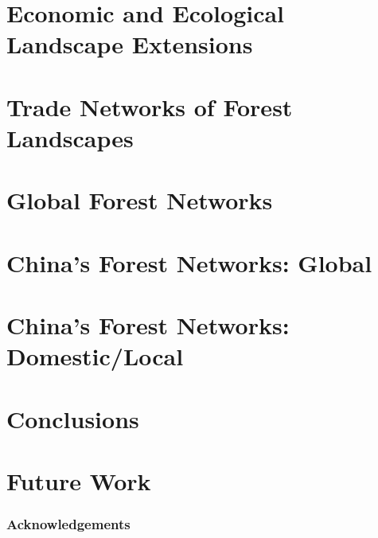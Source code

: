 \documentclass[aspectratio=169]{beamer}
\begin{document}
\section{Economic and Ecological Landscape Extensions}



\section{Trade Networks of Forest Landscapes}

\section{Global Forest Networks}


\section{China's Forest Networks: Global}


\section{China's Forest Networks: Domestic/Local}


\section{Conclusions}

\section{Future Work}

\begin{frame}
  \frametitle{Acknowledgements}
\end{frame}
\end{document}
